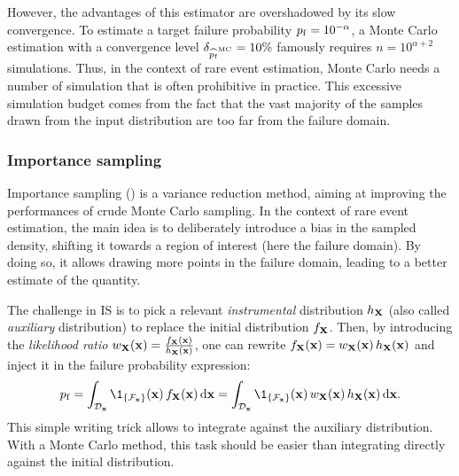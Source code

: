 However, the advantages of this estimator are overshadowed by its slow convergence. 
To estimate a target failure probability $p_\mathrm{f}=10^{-\alpha}$, 
a Monte Carlo estimation with a convergence level $\delta_{\widehat{p_\mathrm{f}}^{\textrm{MC}}} = 10\%$ famously requires $n=10^{\alpha + 2}$ simulations. 
Thus, in the context of rare event estimation, Monte Carlo needs a number of simulation that is often prohibitive in practice. 
This excessive simulation budget comes from the fact that the vast majority of the samples drawn from the input distribution are too far from the failure domain.


\subsubsection{Importance sampling}

Importance sampling () is a variance reduction method, aiming at improving the performances of crude Monte Carlo sampling. 
In the context of rare event estimation, the main idea is to deliberately introduce a bias in the sampled density, shifting it towards a region of interest (here the failure domain). 
By doing so, it allows drawing more points in the failure domain, leading to a better estimate of the quantity.

The challenge in IS is to pick a relevant \textit{instrumental} distribution $h_{\bf X}$ (also called \textit{auxiliary} distribution) to replace the initial distribution $f_{\bf X}$. 
Then, by introducing the \textit{likelihood ratio} $w_{\bf X}({\bf x}) = \frac{f_{\bf X}({\bf x})}{h_{\bf X}({\bf x})}$, one can rewrite $f_{\bf X}({\bf x}) = w_{\bf X}({\bf x}) \, h_{\bf X}({\bf x})$ and inject it in the failure probability expression: 
\begin{equation}
    \pf = \int_{\iD_\bx} \1_{\{\iF_\bx\}}(\bx) \, f_\bX(\bx) \, \dd\bx
        = \int_{\iD_\bx} \1_{\{\iF_\bx\}}(\bx) \, w_\bX(\bx) \, h_\bX(\bx) \, \dd\bx.
\end{equation}
This simple writing trick allows to integrate against the auxiliary distribution. 
With a Monte Carlo method, this task should be easier than integrating directly against the initial distribution.

